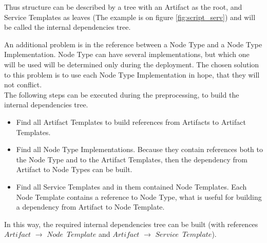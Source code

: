 Thus structure can be described by a tree with an Artifact as the root, and Service Templates as leaves (The example is on figure \ref{fig:script_serv}) and will be called the internal dependencies tree.

An additional problem is in the reference between a Node Type and a Node Type Implementation.
Node Type can have several implementations, but which one will be used will be determined only during the deployment. 
The chosen solution to this problem is to use each Node Type Implementation in hope, that they will not conflict.\\
The following steps can be executed during the preprocessing, to build the internal dependencies tree.
\begin{itemize}
	\item Find all Artifact Templates to build references from Artifacts to Artifact Templates.
	\item Find all Node Type Implementations. Because they contain references both to the Node Type and to the Artifact Templates, then the dependency from Artifact to Node Types can be built.
	\item Find all Service Templates and in them contained Node Templates. Each Node Template contains a reference to Node Type, what is useful for building a dependency from Artifact to Node Template.
\end{itemize} 
In this way, the required internal dependencies tree can be built (with references $Artifact$ $\rightarrow$ $Node$~$Template$ and $Artifact$ $\rightarrow$ $Service$~$Template$).
